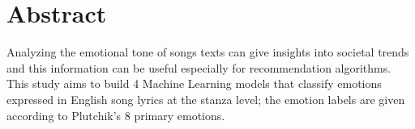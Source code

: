 \chapter*{Abstract}
Analyzing the emotional tone of songs texts can give insights into
societal trends and this information can be useful especially for recommendation
algorithms.
This study aims to build 4 Machine Learning models that classify
emotions expressed in English song lyrics at the stanza level; 
the emotion labels are given according to
Plutchik's 8 primary emotions.